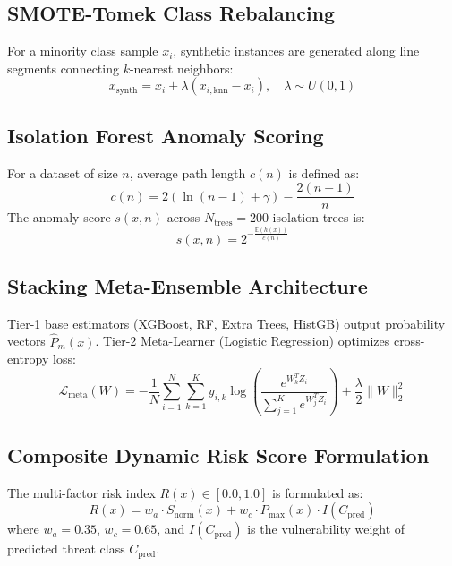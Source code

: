 \documentclass[conference]{IEEEtran}
\begin{document}
\subsection{SMOTE-Tomek Class Rebalancing}
For a minority class sample $x_i$, synthetic instances are generated along line segments connecting $k$-nearest neighbors:
\begin{equation}
x_{\text{synth}} = x_i + \lambda (x_{i,\text{knn}} - x_i), \quad \lambda \sim U(0, 1)
\end{equation}

\subsection{Isolation Forest Anomaly Scoring}
For a dataset of size $n$, average path length $c(n)$ is defined as:
\begin{equation}
c(n) = 2 \left( \ln(n - 1) + \gamma \right) - \frac{2(n - 1)}{n}
\end{equation}
The anomaly score $s(x, n)$ across $N_{\text{trees}} = 200$ isolation trees is:
\begin{equation}
s(x, n) = 2^{-\frac{\mathbb{E}(h(x))}{c(n)}}
\end{equation}

\subsection{Stacking Meta-Ensemble Architecture}
Tier-1 base estimators (XGBoost, RF, Extra Trees, HistGB) output probability vectors $\hat{P}_m(x)$. Tier-2 Meta-Learner (Logistic Regression) optimizes cross-entropy loss:
\begin{equation}
\mathcal{L}_{\text{meta}}(W) = -\frac{1}{N} \sum_{i=1}^{N} \sum_{k=1}^{K} y_{i,k} \log \left( \frac{e^{W_k^T Z_i}}{\sum_{j=1}^{K} e^{W_j^T Z_i}} \right) + \frac{\lambda}{2} \|W\|_2^2
\end{equation}

\subsection{Composite Dynamic Risk Score Formulation}
The multi-factor risk index $R(x) \in [0.0, 1.0]$ is formulated as:
\begin{equation}
R(x) = w_a \cdot S_{\text{norm}}(x) + w_c \cdot P_{\text{max}}(x) \cdot I(C_{\text{pred}})
\end{equation}
where $w_a = 0.35$, $w_c = 0.65$, and $I(C_{\text{pred}})$ is the vulnerability weight of predicted threat class $C_{\text{pred}}$.
\end{document}
